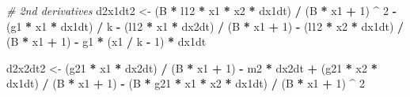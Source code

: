 \documentclass[12pt,twoside,openany]{reedthesis}
\newenvironment{Shaded}{\begin{snugshade}}{\end{snugshade}}
\newcommand{\DecValTok}[1]{\textcolor[rgb]{0.00,0.00,0.81}{#1}}
\newcommand{\StringTok}[1]{\textcolor[rgb]{0.31,0.60,0.02}{#1}}
\newcommand{\CommentTok}[1]{\textcolor[rgb]{0.56,0.35,0.01}{\textit{#1}}}
\newcommand{\OperatorTok}[1]{\textcolor[rgb]{0.81,0.36,0.00}{\textbf{#1}}}
\newcommand{\NormalTok}[1]{#1}
\begin{document}
\begin{Shaded}
\begin{Highlighting}[]
  \CommentTok{# 2nd derivatives}
\NormalTok{  d2x1dt2 <-}
\StringTok{  }\NormalTok{(B }\OperatorTok{*}\StringTok{ }\NormalTok{l12 }\OperatorTok{*}\StringTok{ }\NormalTok{x1 }\OperatorTok{*}\StringTok{ }\NormalTok{x2 }\OperatorTok{*}\StringTok{ }\NormalTok{dx1dt) }\OperatorTok{/}\StringTok{ }\NormalTok{(B }\OperatorTok{*}\StringTok{ }\NormalTok{x1 }\OperatorTok{+}\StringTok{ }\DecValTok{1}\NormalTok{) }\OperatorTok{^}\StringTok{ }\DecValTok{2} \OperatorTok{-}\StringTok{ }\NormalTok{(g1 }\OperatorTok{*}\StringTok{ }\NormalTok{x1 }\OperatorTok{*}\StringTok{ }\NormalTok{dx1dt) }\OperatorTok{/}\StringTok{ }\NormalTok{k }\OperatorTok{-}\StringTok{ }\NormalTok{(l12 }\OperatorTok{*}
\StringTok{  }\NormalTok{x1 }\OperatorTok{*}\StringTok{ }\NormalTok{dx2dt) }\OperatorTok{/}\StringTok{ }\NormalTok{(B }\OperatorTok{*}\StringTok{ }\NormalTok{x1 }\OperatorTok{+}\StringTok{ }\DecValTok{1}\NormalTok{) }\OperatorTok{-}\StringTok{ }\NormalTok{(l12 }\OperatorTok{*}\StringTok{ }\NormalTok{x2 }\OperatorTok{*}\StringTok{ }\NormalTok{dx1dt) }\OperatorTok{/}\StringTok{ }\NormalTok{(B }\OperatorTok{*}\StringTok{ }\NormalTok{x1 }\OperatorTok{+}\StringTok{ }\DecValTok{1}\NormalTok{) }\OperatorTok{-}\StringTok{ }\NormalTok{g1 }\OperatorTok{*}\StringTok{ }\NormalTok{(x1 }\OperatorTok{/}
\StringTok{  }\NormalTok{k }\OperatorTok{-}\StringTok{ }\DecValTok{1}\NormalTok{) }\OperatorTok{*}\StringTok{ }\NormalTok{dx1dt}
  
\NormalTok{  d2x2dt2 <-}
\StringTok{  }\NormalTok{(g21 }\OperatorTok{*}\StringTok{ }\NormalTok{x1 }\OperatorTok{*}\StringTok{ }\NormalTok{dx2dt) }\OperatorTok{/}\StringTok{ }\NormalTok{(B }\OperatorTok{*}\StringTok{ }\NormalTok{x1 }\OperatorTok{+}\StringTok{ }\DecValTok{1}\NormalTok{) }\OperatorTok{-}\StringTok{ }\NormalTok{m2 }\OperatorTok{*}\StringTok{ }\NormalTok{dx2dt }\OperatorTok{+}\StringTok{ }\NormalTok{(g21 }\OperatorTok{*}\StringTok{ }\NormalTok{x2 }\OperatorTok{*}\StringTok{ }\NormalTok{dx1dt) }\OperatorTok{/}\StringTok{ }\NormalTok{(B }\OperatorTok{*}
\StringTok{  }\NormalTok{x1 }\OperatorTok{+}\StringTok{ }\DecValTok{1}\NormalTok{) }\OperatorTok{-}\StringTok{ }\NormalTok{(B }\OperatorTok{*}\StringTok{ }\NormalTok{g21 }\OperatorTok{*}\StringTok{ }\NormalTok{x1 }\OperatorTok{*}\StringTok{ }\NormalTok{x2 }\OperatorTok{*}\StringTok{ }\NormalTok{dx1dt) }\OperatorTok{/}\StringTok{ }\NormalTok{(B }\OperatorTok{*}\StringTok{ }\NormalTok{x1 }\OperatorTok{+}\StringTok{ }\DecValTok{1}\NormalTok{) }\OperatorTok{^}\StringTok{ }\DecValTok{2}
  

\end{Highlighting}
\end{Shaded}
\end{document}
